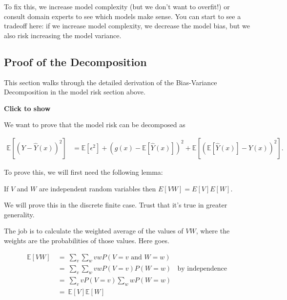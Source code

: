\documentclass[
  letterpaper,
  DIV=11,
  numbers=noendperiod]{scrreprt}
\begin{document}
To fix this, we increase model complexity (but we don't want to
overfit!) or consult domain experts to see which models make sense. You
can start to see a tradeoff here: if we increase model complexity, we
decrease the model bias, but we also risk increasing the model variance.

\subsection{Proof of the
Decomposition}\label{proof-of-the-decomposition}

This section walks through the detailed derivation of the Bias-Variance
Decomposition in the model risk section above.

\begin{tcolorbox}[enhanced jigsaw, breakable, arc=.35mm, leftrule=.75mm, left=2mm, colframe=quarto-callout-color-frame, rightrule=.15mm, bottomrule=.15mm, toprule=.15mm, opacityback=0, colback=white]

\vspace{-3mm}\textbf{Click to show}\vspace{3mm}

We want to prove that the model risk can be decomposed as

\[
\begin{align*}
\mathbb{E}\left[(Y-\hat{Y}(x))^2\right] &= \mathbb{E}[\epsilon^2] + \left(g(x)-\mathbb{E}\left[\hat{Y}(x)\right]\right)^2 + \mathbb{E}\left[\left(\mathbb{E}\left[\hat{Y}(x)\right] - \hat{Y}(x)\right)^2\right].
\end{align*}
\]

To prove this, we will first need the following lemma:

If \(V\) and \(W\) are independent random variables then
\(E[VW] = E[V]E[W]\).

We will prove this in the discrete finite case. Trust that it's true in
greater generality.

The job is to calculate the weighted average of the values of \(VW\),
where the weights are the probabilities of those values. Here goes.

\begin{align*}
\mathbb{E}[VW] ~ &= ~ \sum_v\sum_w vwP(V=v \text{ and } W=w) \\
&= ~ \sum_v\sum_w vwP(V=v)P(W=w) ~~~~ \text{by independence} \\
&= ~ \sum_v vP(V=v)\sum_w wP(W=w) \\
&= ~ \mathbb{E}[V]\mathbb{E}[W]
\end{align*}


\end{tcolorbox}
\end{document}
